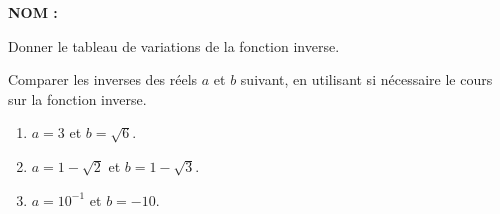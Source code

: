 \documentclass[a4paper,11pt,DIV15,BCOR0mm]{scrartcl}
\begin{document}
\newcommand{\vv}[1]{\vect{#1}}
\noindent\textbf{NOM : }

\begin{exercice}[Cours]
Donner le tableau de variations de la fonction inverse.
\end{exercice}
\vfill

\begin{exercice}
Comparer les inverses des réels $a$ et $b$ suivant, en utilisant si nécessaire
le cours sur la fonction inverse.
\begin{enumerate}
\item $a=3$ et $b=\sqrt{6}$.
\vfill
\item $a=1-\sqrt{2}$ et $b=1-\sqrt{3}$.
\vfill
\item $a=10^{-1}$ et $b=-10$.
\vfill

\end{enumerate}
\end{exercice}
\end{document}
